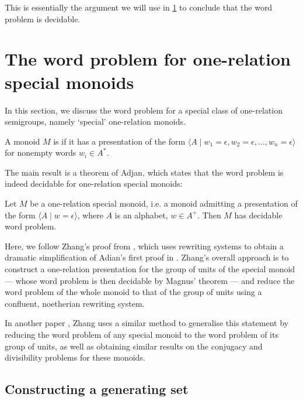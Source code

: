 \documentclass[noindex,noinsetproof,12pt]{lmaths}
\begin{document}
This is essentially the argument we will use in \cref{sec:special-monoids} to conclude that the word problem is decidable.

\section{The word problem for one-relation special monoids} \label{sec:special-monoids}

In this section, we discuss the word problem for a special class of one-relation semigroups, namely `special' one-relation monoids.

\begin{defn} \label{def:special}
	A monoid $M$ is  if it has a presentation of the form $\langle A \mid w_1 = \epsilon, w_2 = \epsilon, \ldots, w_n = \epsilon \rangle$ for nonempty words $w_i \in A^*$.
\end{defn}

The main result is a theorem of Adjan, which states that the word problem is indeed decidable for one-relation special monoids:

\begin{theorem}[Adjan] \label{thm:ors-decidablewp}
	Let $M$ be a one-relation special monoid, i.e. a monoid admitting a presentation of the form $\langle A \mid w = \epsilon\rangle$, where $A$ is an alphabet, $w \in A^+$. Then $M$ has decidable word problem.
\end{theorem}

Here, we follow Zhang's proof from \cite{Zhang1992a}, which uses rewriting systems to obtain a dramatic simplification of Adian's first proof in \cite{Adian1966}. Zhang's overall approach is to construct a one-relation presentation for the group of units of the special monoid --- whose word problem is then decidable by Magnus' theorem --- and reduce the word problem of the whole monoid to that of the group of units using a confluent, noetherian rewriting system.

In another paper \cite{Zhang1992}, Zhang uses a similar method to generalise this statement by reducing the word problem of any special monoid to the word problem of its group of units, as well as obtaining similar results on the conjugacy and divisibility problems for these monoids.


\subsection{Constructing a generating set} \label{sec:constructing-genset}
\end{document}
